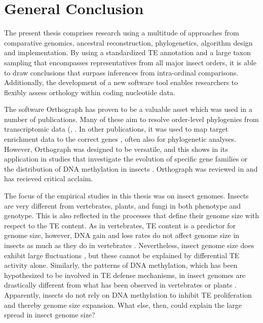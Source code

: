 \chapter{General Conclusion}
\label{conclusion}

The present thesis comprises research using a multitude of approaches
from comparative genomics, ancestral reconstruction, phylogenetics,
algorithm design and implementation. By using a standardized TE
annotation and a large taxon sampling that encompasses representatives
from all major insect orders, it is able to draw conclusions that
surpass inferences from intra-ordinal comparisons.  Additionally, the
development of a new software tool enables researchers to flexibly
assess orthology within coding nucleotide data.

The software Orthograph has proven to be a valuable asset which was used
in a number of publications. Many of these aim to resolve order-level
phylogenies from transcriptomic data (\eg, \citet{Peters2017, Bank2017,
Kutty2018, Simon2018, Gillung2018, Johnson2018}. In other publications,
it was used to map target enrichment data to the correct genes
\citep{Mayer2016, Shin2017, Sann2018}, often also for phylogenetic
analyses. However, Orthograph was designed to be versatile, and this
shows in its application in studies that investigate the evolution of
specific gene families \citep{Pauli2016, Dowling2017} or the
distribution of DNA methylation in insects \citep{Provataris2018}.
Orthograph was reviewed in \citet{Nichio2017} and has recieved critical
acclaim.

The focus of the empirical studies in this thesis was on insect genomes.
Insects are very different from vertebrates, plants, and fungi in both phenotype
and genotype. This is also reflected in the processes that define their
genome size with respect to the TE content. As in vertebrates, TE
content is a predictor for genome size, however,  DNA gain and loss
rates do not affect genome size in insects as much as they do in
vertebrates \citep{Kapusta2017-1,Lindblad-Toh2005}.  Nevertheless,
insect genome size does exhibit large fluctuations \citep{Alfsnes2017},
but these cannot be explained by differential TE activity alone.
Similarly, the patterns of DNA methylation, which has been hypothesized
to be involved in TE defense mechanisms, in insect genomes are
drastically different from what has been observed in vertebrates or
plants \citep{Provataris2018,Suzuki2008}.  Apparently, insects do not
rely on DNA methylation to inhibit TE proliferation and thereby genome
size expansion. What else, then, could explain the large spread in
insect genome size?

